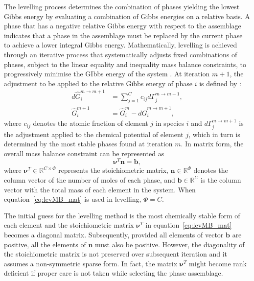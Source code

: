 	The levelling process determines the combination of phases yielding the lowest Gibbs energy by evaluating a combination of Gibbs energies on a relative basis. A phase that has a negative relative Gibbs energy with respect to the assemblage indicates that a phase in the assemblage must be replaced by the current phase to achieve a lower integral Gibbs energy. Mathematically, levelling is achieved through an iterative process that systematically adjusts fixed combinations of phases, subject to the linear equality and inequality mass balance constraints, to progressively minimise the GIbbs energy of the system \cite{Piro12a}. At iteration $m+1$, the adjustment to be applied to the relative Gibbs energy of phase $i$ is defined by \cite{Eriksson89}:
	\begin{equation} \label{eq:lev_adj}
		\begin{aligned}
			d \hat{G}_i^{m\rightarrow m+1} &= \sum_{j=1}^{C} c_{ij} d \Gamma_j^{m\rightarrow m+1},\\
			\hat{G}_i^{m+1} &= \hat{G}_i^{m} - d \hat{G}_i^{m\rightarrow m+1},
		\end{aligned}
	\end{equation}
	where $c_{ij}$ denotes the atomic fraction of element $j$ in species $i$ and $d \Gamma_j^{m\rightarrow m+1}$ is the adjustment applied to the chemical potential of element $j$, which in turn is determined by the most stable phases found at iteration $m$. In  matrix form, the overall mass balance constraint can be represented as \cite{Piro12a}
	\begin{equation} \label{eq:levMB_mat}
		\boldsymbol{\nu}^T \mathbf{n}= \mathbf{b},
	\end{equation}
	where $\boldsymbol{\nu}^T \in \mathbb{R}^{C \times \Phi}$ represents the stoichiometric matrix, $\mathbf{n} \in \mathbb{R}^{\Phi}$ denotes the column vector of the number of moles of each phase, and $\mathbf{b} \in \mathbb{R}^{C}$ is the column vector with the total mass of each element in the system. When equation~\ref{eq:levMB_mat} is used in levelling, $\Phi = C$.

	The initial guess for the levelling method is the most chemically stable form of each element and the stoichiometric matrix $\boldsymbol{\nu}^T$ in equation~\eqref{eq:levMB_mat} becomes a diagonal matrix. Subsequently, provided all elements of vector $\mathbf{b}$ are positive, all the elements of $\mathbf{n}$ must also be positive. However, the diagonality of the stoichiometric matrix is not preserved over subsequent iteration and it assumes a non-symmetric sparse form. In fact, the matrix $\boldsymbol{\nu}^T$ might become rank deficient if proper care is not taken while selecting the phase assemblage.

